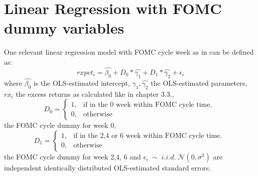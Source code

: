 \newpage

\section{Linear Regression with FOMC dummy variables}

One relevant linear regression model with FOMC cycle week as in \parencite{cieslak_stock_2019} can be defined as:
\begin{equation}
	rxpct_{i}=\hat{\beta_{0}}+D_0*\hat{\gamma_{1}}+D_1*\hat{\gamma_{2}}+\epsilon_i
\end{equation}
where
$ { \hat{\beta_{0}} } $ is the OLS-estimated intercept,
$ { \hat{\gamma_{1}}, \hat{\gamma_{2}} } $ the OLS-estimated parameters,
${ rx_{i} } $ the excess returns as calculated like in chapter 3.3., 
\begin{equation}
    D_0=
    \begin{cases}
      1, & \text{if in the 0 week within FOMC cycle time. }\\
      0, & \text{otherwise}
    \end{cases}
\end{equation}
the FOMC cycle dummy for week 0, 
\begin{equation}
    D_1=
    \begin{cases}
      1, & \text{if in the 2,4 or 6 week within FOMC cycle time. } \\
      0, & \text{otherwise}
    \end{cases}
\end{equation}
the FOMC cycle dummy for week 2,4, 6 and
$ { \epsilon_i \; \sim \; i.i.d.  \; \mathcal{N}\left(0, \sigma^2 \right) } $
are independent identically distributed OLS-estimated standard errors. 


\newpage


